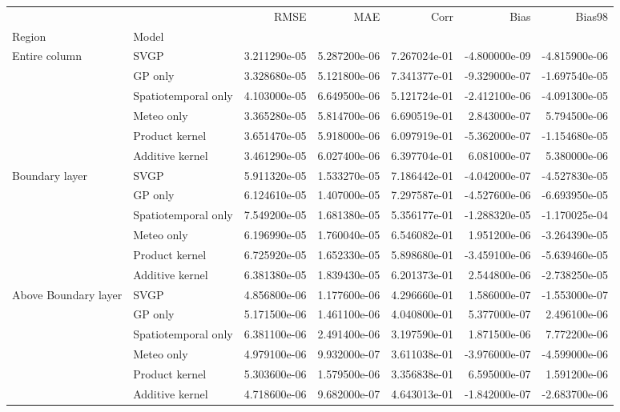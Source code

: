 \begin{tabular}{llrrrrr}
\toprule
                     &                 &         RMSE &          MAE &         Corr &          Bias &        Bias98 \\
Region & Model &              &              &              &               &               \\
\midrule
Entire column & SVGP & 3.211290e-05 & 5.287200e-06 & 7.267024e-01 & -4.800000e-09 & -4.815900e-06 \\
                     & GP only & 3.328680e-05 & 5.121800e-06 & 7.341377e-01 & -9.329000e-07 & -1.697540e-05 \\
                     & Spatiotemporal only & 4.103000e-05 & 6.649500e-06 & 5.121724e-01 & -2.412100e-06 & -4.091300e-05 \\
                     & Meteo only & 3.365280e-05 & 5.814700e-06 & 6.690519e-01 &  2.843000e-07 &  5.794500e-06 \\
                     & Product kernel & 3.651470e-05 & 5.918000e-06 & 6.097919e-01 & -5.362000e-07 & -1.154680e-05 \\
                     & Additive kernel & 3.461290e-05 & 6.027400e-06 & 6.397704e-01 &  6.081000e-07 &  5.380000e-06 \\
Boundary layer & SVGP & 5.911320e-05 & 1.533270e-05 & 7.186442e-01 & -4.042000e-07 & -4.527830e-05 \\
                     & GP only & 6.124610e-05 & 1.407000e-05 & 7.297587e-01 & -4.527600e-06 & -6.693950e-05 \\
                     & Spatiotemporal only & 7.549200e-05 & 1.681380e-05 & 5.356177e-01 & -1.288320e-05 & -1.170025e-04 \\
                     & Meteo only & 6.196990e-05 & 1.760040e-05 & 6.546082e-01 &  1.951200e-06 & -3.264390e-05 \\
                     & Product kernel & 6.725920e-05 & 1.652330e-05 & 5.898680e-01 & -3.459100e-06 & -5.639460e-05 \\
                     & Additive kernel & 6.381380e-05 & 1.839430e-05 & 6.201373e-01 &  2.544800e-06 & -2.738250e-05 \\
Above Boundary layer & SVGP & 4.856800e-06 & 1.177600e-06 & 4.296660e-01 &  1.586000e-07 & -1.553000e-07 \\
                     & GP only & 5.171500e-06 & 1.461100e-06 & 4.040800e-01 &  5.377000e-07 &  2.496100e-06 \\
                     & Spatiotemporal only & 6.381100e-06 & 2.491400e-06 & 3.197590e-01 &  1.871500e-06 &  7.772200e-06 \\
                     & Meteo only & 4.979100e-06 & 9.932000e-07 & 3.611038e-01 & -3.976000e-07 & -4.599000e-06 \\
                     & Product kernel & 5.303600e-06 & 1.579500e-06 & 3.356838e-01 &  6.595000e-07 &  1.591200e-06 \\
                     & Additive kernel & 4.718600e-06 & 9.682000e-07 & 4.643013e-01 & -1.842000e-07 & -2.683700e-06 \\
\bottomrule
\end{tabular}
